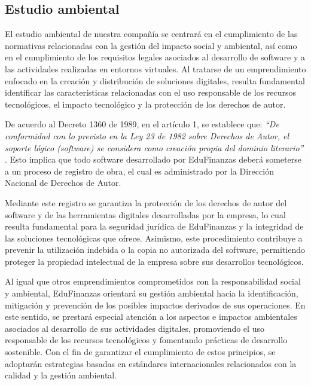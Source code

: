 
{}
\subsection*{Estudio ambiental}


El estudio ambiental de nuestra compañía se centrará en el cumplimiento de las normativas relacionadas con la gestión del impacto social y ambiental, así como en el cumplimiento de los requisitos legales asociados al desarrollo de software y a las actividades realizadas en entornos virtuales. Al tratarse de un emprendimiento enfocado en la creación y distribución de soluciones digitales, resulta fundamental identificar las características relacionadas con el uso responsable de los recursos tecnológicos, el impacto tecnológico y la protección de los derechos de autor.

De acuerdo al Decreto 1360 de 1989, en el artículo 1, se establece que: \textit{``De conformidad con lo previsto en la Ley 23 de 1982 sobre Derechos de Autor, el soporte lógico (software) se considera como creación propia del dominio literario''} \parencite{Decreto1360}. Esto implica que todo software desarrollado por EduFinanzas deberá someterse a un proceso de registro de obra, el cual es administrado por la Dirección Nacional de Derechos de Autor.

Mediante este registro se garantiza la protección de los derechos de autor del software y de las herramientas digitales desarrolladas por la empresa, lo cual resulta fundamental para la seguridad jurídica de EduFinanzas y la integridad de las soluciones tecnológicas que ofrece. Asimismo, este procedimiento contribuye a prevenir la utilización indebida o la copia no autorizada del software, permitiendo proteger la propiedad intelectual de la empresa sobre sus desarrollos tecnológicos.

Al igual que otros emprendimientos comprometidos con la responsabilidad social y ambiental, EduFinanzas orientará su gestión ambiental hacia la identificación, mitigación y prevención de los posibles impactos derivados de sus operaciones. En este sentido, se prestará especial atención a los aspectos e impactos ambientales asociados al desarrollo de sus actividades digitales, promoviendo el uso responsable de los recursos tecnológicos y fomentando prácticas de desarrollo sostenible. Con el fin de garantizar el cumplimiento de estos principios, se adoptarán estrategias basadas en estándares internacionales relacionados con la calidad y la gestión ambiental.

